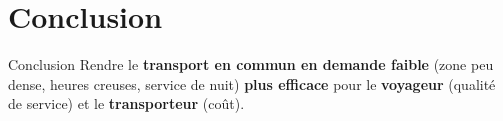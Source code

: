 \documentclass[table]{beamer}
\begin{document}

\section{Conclusion}

\begin{frame}{Conclusion}
  Rendre le \textbf{transport en commun en demande faible} (zone peu
  dense, heures creuses, service de nuit) \textbf{plus efficace} pour
  le \textbf{voyageur} (qualité de service) et le
  \textbf{transporteur} (coût).
\end{frame}

\begin{frame}
  \titlepage
\end{frame}
\end{document}
